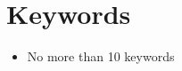 %
%
%
%
%

\chapter{Keywords}

\begin{itemize}
    \item No more than 10 keywords
\end{itemize}

\endinput

